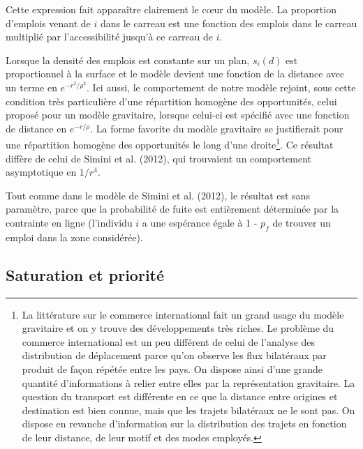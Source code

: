 \documentclass[
  10pt,
  a4paper,
  numbers=noendperiod,
  DIV=12]{scrartcl}
\begin{document}
Cette expression fait apparaître clairement le cœur du modèle. La
proportion d'emplois venant de \(i\) dans le carreau est une fonction
des emplois dans le carreau multiplié par l'accessibilité jusqu'à ce
carreau de \(i\).

Lorsque la densité des emplois est constante sur un plan, \(s_i(d)\) est
proportionnel à la surface et le modèle devient une fonction de la
distance avec un terme en \(e^{-r^2/\rho^2}\). Ici aussi, le
comportement de notre modèle rejoint, sous cette condition très
particulière d'une répartition homogène des opportunités, celui proposé
pour un modèle gravitaire, lorsque celui-ci est spécifié avec une
fonction de distance en \(e^{-r/\rho}\). La forme favorite du modèle
gravitaire se justifierait pour une répartition homogène des
opportunités le long d'une droite\footnote{La littérature sur le
  commerce international fait un grand usage du modèle gravitaire et on
  y trouve des développements très riches. Le problème du commerce
  international est un peu différent de celui de l'analyse des
  distribution de déplacement parce qu'on observe les flux bilatéraux
  par produit de façon répétée entre les pays. On dispose ainsi d'une
  grande quantité d'informations à relier entre elles par la
  représentation gravitaire. La question du transport est différente en
  ce que la distance entre origines et destination est bien connue, mais
  que les trajets bilatéraux ne le sont pas. On dispose en revanche
  d'information sur la distribution des trajets en fonction de leur
  distance, de leur motif et des modes employés.}. Ce résultat diffère
de celui de Simini et al. (2012), qui trouvaient un comportement
asymptotique en \(1/r^4\).

Tout comme dans le modèle de Simini et al. (2012), le résultat est sans
paramètre, parce que la probabilité de fuite est entièrement déterminée
par la contrainte en ligne (l'individu \(i\) a une espérance égale à 1 -
\(p_f\) de trouver un emploi dans la zone considérée).

\hypertarget{sec-priorite}{%
\subsection{Saturation et priorité}\label{sec-priorite}}
\end{document}

